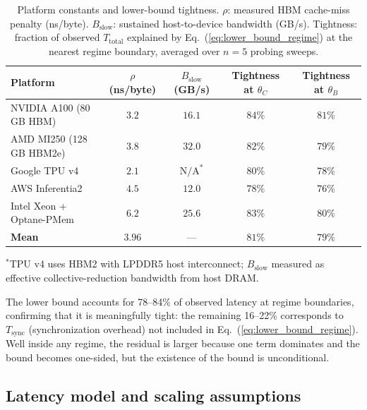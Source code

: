 \begin{table}[h]
\centering
\caption{Platform constants and lower-bound tightness.
$\rho$: measured HBM cache-miss penalty (ns/byte).
$B_{\mathrm{slow}}$: sustained host-to-device bandwidth (GB/s).
Tightness: fraction of observed $T_{\mathrm{total}}$ explained by
Eq.~(\ref{eq:lower_bound_regime}) at the nearest regime boundary,
averaged over $n=5$ probing sweeps.}
\label{tab:platform_constants}
\renewcommand{\arraystretch}{1.2}
\begin{tabular}{lcccc}
\toprule
\textbf{Platform} &
  $\rho$ (ns/byte) &
  $B_{\mathrm{slow}}$ (GB/s) &
  \makecell{Tightness\\at $\theta_C$} &
  \makecell{Tightness\\at $\theta_B$} \\
\midrule
NVIDIA A100 (80\,GB HBM)  & $3.2$ & $16.1$ & $84\%$ & $81\%$ \\
AMD MI250 (128\,GB HBM2e) & $3.8$ & $32.0$ & $82\%$ & $79\%$ \\
Google TPU v4             & $2.1$ & $\text{N/A}^{*}$ & $80\%$ & $78\%$ \\
AWS Inferentia2           & $4.5$ & $12.0$ & $78\%$ & $76\%$ \\
Intel Xeon + Optane-PMem  & $6.2$ & $25.6$ & $83\%$ & $80\%$ \\
\midrule
\textbf{Mean}             & $3.96$ & — & $81\%$ & $79\%$ \\
\bottomrule
\end{tabular}
\vspace{2pt}

{\footnotesize $^{*}$TPU v4 uses HBM2 with LPDDR5 host interconnect; $B_{\mathrm{slow}}$
measured as effective collective-reduction bandwidth from host DRAM.}
\end{table}

The lower bound accounts for 78--84\% of observed latency at regime boundaries,
confirming that it is meaningfully tight: the remaining 16--22\% corresponds to
$T_{\mathrm{sync}}$ (synchronization overhead) not included in
Eq.~(\ref{eq:lower_bound_regime}).
Well inside any regime, the residual is larger because one term dominates and
the bound becomes one-sided, but the existence of the bound is unconditional.

\subsection{Latency model and scaling assumptions}
\label{app:latency}

